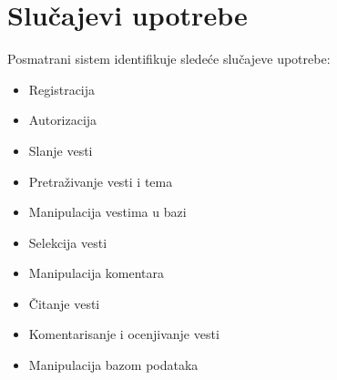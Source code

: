 \documentclass{article}
\begin{document}
\newpage

\section{Slučajevi upotrebe}
\indent Posmatrani sistem identifikuje sledeće slučajeve upotrebe:
\begin{itemize} 
\item Registracija
\item Autorizacija 
\item Slanje vesti
\item Pretraživanje vesti i tema
\item Manipulacija vestima u bazi
\item Selekcija vesti 
\item Manipulacija komentara
\item Čitanje vesti
\item Komentarisanje i ocenjivanje vesti
\item Manipulacija bazom podataka

\end{itemize}
\end{document}
